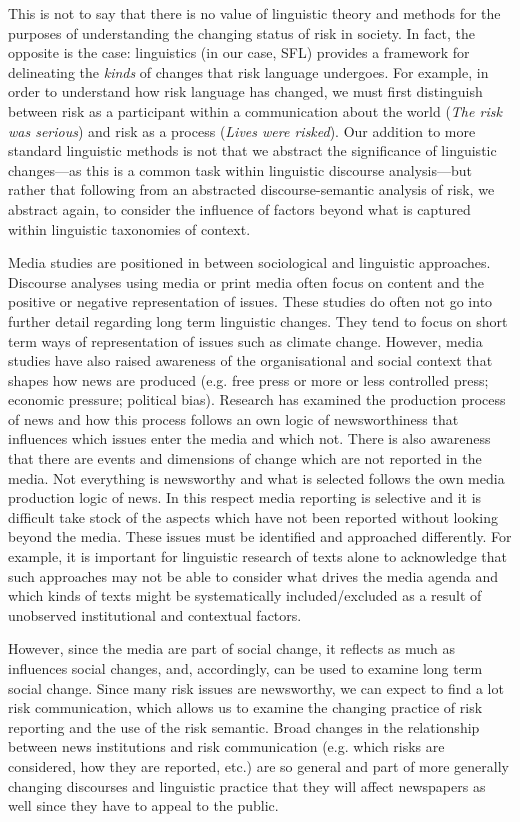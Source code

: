 \documentclass{report}
\begin{document}
This is not to say that there is no value of linguistic theory and methods for the purposes of understanding the changing status of risk in society. In fact, the opposite is the case: linguistics (in our case, SFL) provides a framework for delineating the \emph{kinds} of changes that risk language undergoes. For example, in order to understand how risk language has changed, we must first distinguish between risk as a participant within a communication about the world (\emph{The risk was serious}) and risk as a process (\emph{Lives were risked}). Our addition to more standard linguistic methods is not that we abstract the significance of linguistic changes---as this is a common task within linguistic discourse analysis---but rather that following from an abstracted discourse-semantic analysis of risk, we abstract again, to consider the influence of factors beyond what is captured within linguistic taxonomies of context.

Media studies are positioned in between sociological and linguistic approaches. Discourse analyses using media or print media often focus on content and the positive or negative representation of issues. These studies do often not go into further detail regarding long term linguistic changes. They tend to focus on short term ways of representation of issues such as climate change. However, media studies have also raised awareness of the organisational and social context that shapes how news are produced (e.g. free press or more or less controlled press; economic pressure; political bias). Research has examined the production process of news and how this process follows an own logic of newsworthiness that influences which issues enter the media and which not. There is also awareness that there are events and dimensions of change which are not reported in the media. Not everything is newsworthy and what is selected follows the own media production logic of news. In this respect media reporting is selective and it is difficult take stock of the aspects which have not been reported without looking beyond the media. These issues must be identified and approached differently. For example, it is important for linguistic research of texts alone to acknowledge that such approaches may not be able to consider what drives the media agenda and which kinds of texts might be systematically included\slash excluded as a result of unobserved institutional and contextual factors.


However, since the media are part of social change, it reflects as much as influences social changes, and, accordingly, can be used to examine long term social change. Since many risk issues are newsworthy, we can expect to find a lot risk communication, which allows us to examine the changing practice of risk reporting and the use of the risk semantic. Broad changes in the relationship between news institutions and risk communication (e.g. which risks are considered, how they are reported, etc.) are so general and part of more generally changing discourses and linguistic practice that they will affect newspapers as well since they have to appeal to the public.
\end{document}
